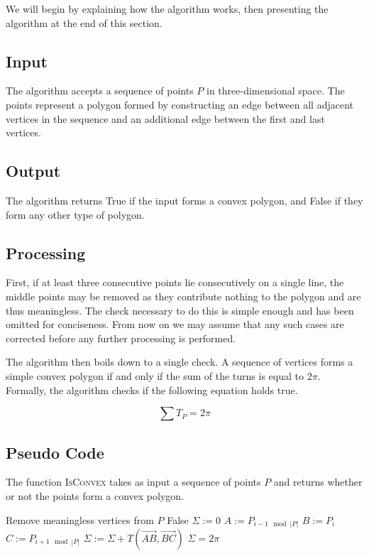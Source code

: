 \documentclass{article}
\newcommand{\vecl}{\overrightarrow} %
\begin{document}
We will begin by explaining how the algorithm works, then presenting the algorithm at the end of this section.

\subsection{Input}

The algorithm accepts a sequence of points \(P\) in three-dimensional space. The points represent a polygon formed by constructing an edge between all adjacent vertices in the sequence and an additional edge between the first and last vertices.

\subsection{Output}

The algorithm returns True if the input forms a convex polygon, and False if they form any other type of polygon.

\subsection{Processing} \label{processing}

First, if at least three consecutive points lie consecutively on a single line, the middle points may be removed as they contribute nothing to the polygon and are thus meaningless. The check necessary to do this is simple enough and has been omitted for conciseness. From now on we may assume that any such cases are corrected before any further processing is performed.

The algorithm then boils down to a single check. A sequence of vertices forms a simple convex polygon if and only if the sum of the turns is equal to \(2\pi\). Formally, the algorithm checks if the following equation holds true.

\begin{equation*}
	\sum T_P = 2\pi
\end{equation*}

\subsection{Pseudo Code}

The function \textsc{IsConvex} takes as input a sequence of points \(P\) and returns whether or not the points form a convex polygon.

\begin{algorithm}[htbp]
	\begin{algorithmic}
		\State Remove meaningless vertices from \(P\)
		\Return False
		\EndIf
		\State \(\Sigma := 0\) 
		\State \(A := P_{i-1 \mod |P|}\) 
		\State \(B := P_{i}\) 
		\State \(C := P_{i+1 \mod |P|}\) 
		\State \(\Sigma := \Sigma + T(\vecl{AB}, \vecl{BC})\) 
		\EndFor
		\State\Return \(\Sigma = 2\pi\)
		\EndFunction
	\end{algorithmic}
\end{algorithm}
\end{document}
